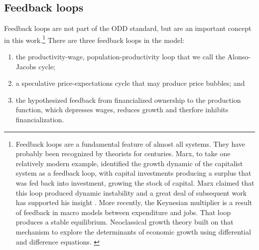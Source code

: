 \subsection{Feedback loops}
Feedback loops are not part of the ODD standard, but are an important concept in this work.\footnote{Feedback loops are a fundamental feature of almost all systems. They have probably been recognized by theorists for centuries. Marx, to take one relatively modern example, identified the growth dynamic of the capitalist system as a feedback loop, with capital investments producing a surplus that was fed back into investment, growing the stock of capital. Marx claimed that this loop produced dynamic instability and a great deal of subsequent work has supported his insight \cite{dumenilStabilityInstabilityDynamic1986} \cite{schumpeterInstabilityCapitalism1928}. More recently, the Keynesian multiplier is a result of feedback in macro models between expenditure and jobs. That loop produces a stable equilibrium. Neoclassical growth theory built on that mechanism to explore the determinants of economic growth using differential and difference equations. \cite{radzickiIntroductionFeedbackEconomics}} 
There are three \glspl{feedback loop} in the model: 
\begin{enumerate}
    \item the productivity-wage, population-productivity loop that we call the Alonso-Jacobs cycle;
    \item a speculative price-expectations cycle that may produce price bubbles; and
    \item the hypothesized feedback from financialized ownership to the production function, which depresses wages, reduces growth and therfore inhibits financialization.
 
\end{enumerate}

